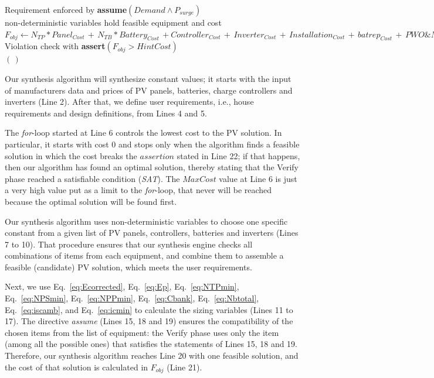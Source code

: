 \documentclass[review]{elsarticle}
\begin{document}
\begin{algorithm}
\begin{algorithmic}[1]
	\STATE Requirement enforced by \textbf{assume}$(Demand \wedge P_{surge})$ \\
	\STATE non-deterministic variables hold feasible equipment and cost  \\
	\STATE $F_{obj} \leftarrow  N_{TP}*Panel_{Cost} \, + \, N_{TB}*Battery_{Cost} \, + Controller_{Cost} \, + \, Inverter_{Cost} \, + \, Installation_{Cost} \, + \, batrep_{Cost} \, + \, PWO\&M_{Cost}$ \\
	\STATE Violation check with \textbf{assert}$(F_{obj} > HintCost)$ \\
  \ENDFOR
 \RETURN $(\,)$ 
 \end{algorithmic} 
 \label{alg:verification-algorithm}
 \end{algorithm}
%

Our synthesis algorithm will synthesize constant values; it starts with the input of manufacturers data and prices of PV panels, batteries, charge controllers and inverters (Line 2). After that, we define user requirements, i.e., house requirements and design definitions, from Lines 4 and 5. 

The \textit{for}-loop started at Line 6 controls the lowest cost to the PV solution. In particular, it starts with cost $0$ and stops only when the algorithm finds a feasible solution in which the cost breaks the $assertion$ stated in Line 22; if that happens, then our algorithm has found an optimal solution, thereby stating that the {\sc Verify} phase reached a satisfiable condition (\textit{SAT}). The $MaxCost$ value at Line 6 is just a very high value put as a limit to the \textit{for}-loop, that never will be reached because the optimal solution will be found first.

Our synthesis algorithm uses non-deterministic variables to choose one specific constant from a given list of PV panels, controllers, batteries and inverters (Lines 7 to 10). That procedure ensures that our synthesis engine checks all combinations of items from each equipment, and combine them to assemble a feasible (candidate) PV solution, which meets the user requirements.

Next, we use Eq.~\eqref{eq:Ecorrected}, Eq.~\eqref{eq:Ep}, Eq.~\eqref{eq:NTPmin}, Eq.~\eqref{eq:NPSmin}, Eq.~\eqref{eq:NPPmin}, Eq.~\eqref{eq:Cbank}, Eq.~\eqref{eq:Nbtotal}, Eq.~\eqref{eq:iscamb}, and Eq.~\eqref{eq:icmin} to calculate the sizing variables (Lines 11 to 17). The directive \textit{assume} (Lines 15, 18 and 19) ensures the compatibility of the chosen items from the list of equipment: the {\sc Verify} phase uses only the item (among all the possible ones) that satisfies the statements of Lines 15, 18 and 19. Therefore, our synthesis algorithm reaches Line 20 with one feasible solution, and the cost of that solution is calculated in $F_{obj}$ (Line 21). 
\end{document}
